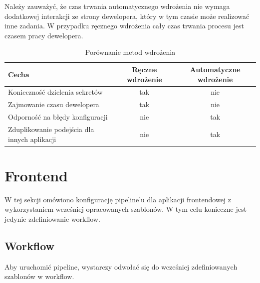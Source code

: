 \documentclass{article}
\begin{document}
Należy zauważyć, że czas trwania automatycznego wdrożenia nie wymaga dodatkowej interakcji ze strony dewelopera, który w tym czasie może realizować inne zadania. W przypadku ręcznego wdrożenia cały czas trwania procesu jest czasem pracy dewelopera.

\begin{table}[H]
\centering
\begin{tabular}{|l|c|c|}
\hline
\textbf{Cecha} & \textbf{Ręczne wdrożenie} & \textbf{Automatyczne wdrożenie} \\ \hline
Konieczność dzielenia sekretów & \cellcolor{red!50}tak & \cellcolor{green!50}nie \\ \hline
Zajmowanie czasu dewelopera & \cellcolor{red!50}tak & \cellcolor{green!50}nie \\ \hline
Odporność na błędy konfiguracji & \cellcolor{red!50}nie & \cellcolor{green!50}tak \\ \hline
Zduplikowanie podejścia dla innych aplikacji & \cellcolor{red!50}nie & \cellcolor{green!50}tak \\ \hline
\end{tabular}
\caption{Porównanie metod wdrożenia}
\label{tab:porownanie-metod-wdrazania}
\end{table}



\section{Frontend}

W tej sekcji omówiono konfigurację pipeline’u dla aplikacji frontendowej z wykorzystaniem wcześniej opracowanych szablonów. W tym celu konieczne jest jedynie zdefiniowanie workflow.

\subsection{Workflow}

Aby uruchomić pipeline, wystarczy odwołać się do wcześniej zdefiniowanych szablonów w workflow.
\end{document}
